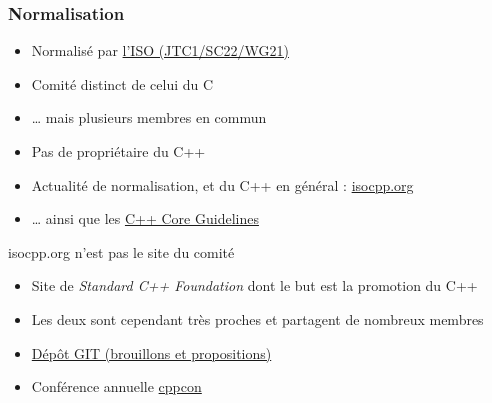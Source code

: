 \documentclass[C++.tex]{subfiles}
\begin{document}
\begin{frame}[fragile]
	\frametitle{Normalisation}
	\begin{itemize}
		\item Normalisé par \href{http://www.open-std.org/JTC1/SC22/WG21/}{l'ISO (JTC1/SC22/WG21)}
		\item Comité distinct de celui du C


		\item \ldots{} mais plusieurs membres en commun
		\item Pas de propriétaire du C++


		\item Actualité de normalisation, et du C++ en général : \href{https://isocpp.org/}{isocpp.org}
		\item \ldots{} ainsi que les \href{https://isocpp.github.io/CppCoreGuidelines/CppCoreGuidelines}{C++ Core Guidelines}
	\end{itemize}

	\begin{alertblock}{isocpp.org n'est pas le site du comité}
		\begin{itemize}
			\item Site de \textit{Standard C++ Foundation} dont le but est la promotion du C++
			\item Les deux sont cependant très proches et partagent de nombreux membres
		\end{itemize}
	\end{alertblock}

	\begin{itemize}
		\item \href{https://github.com/cplusplus}{Dépôt GIT (brouillons et propositions)}
		\item Conférence annuelle \href{http://cppcon.org/}{cppcon}
	\end{itemize}
\end{frame}
\end{document}
